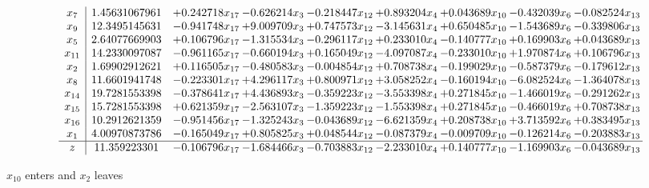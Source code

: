 \documentclass[10pt]{article}
\begin{document}
 \[\begin{array}{c| c c@{\hskip 2pt} c@{\hskip 2pt} c@{\hskip 2pt} c@{\hskip 2pt} c@{\hskip 2pt} c@{\hskip 2pt} c@{\hskip 2pt} }
 x_{7}   &  1.45631067961 & + 0.242718 x_{17} & -0.626214 x_{3} & -0.218447 x_{12} & + 0.893204 x_{4} & + 0.043689 x_{10} & -0.432039 x_{6} & -0.082524 x_{13}\\
 x_{9}   &  12.3495145631 & -0.941748 x_{17} & + 9.009709 x_{3} & + 0.747573 x_{12} & -3.145631 x_{4} & + 0.650485 x_{10} & -1.543689 x_{6} & -0.339806 x_{13}\\
 x_{5}   &  2.64077669903 & + 0.106796 x_{17} & -1.315534 x_{3} & -0.296117 x_{12} & + 0.233010 x_{4} & -0.140777 x_{10} & + 0.169903 x_{6} & + 0.043689 x_{13}\\
 x_{11}   &  14.2330097087 & -0.961165 x_{17} & -0.660194 x_{3} & + 0.165049 x_{12} & -4.097087 x_{4} & -0.233010 x_{10} & + 1.970874 x_{6} & + 0.106796 x_{13}\\
 x_{2}   &  1.69902912621 & + 0.116505 x_{17} & -0.480583 x_{3} & -0.004854 x_{12} & + 0.708738 x_{4} & -0.199029 x_{10} & -0.587379 x_{6} & -0.179612 x_{13}\\
 x_{8}   &  11.6601941748 & -0.223301 x_{17} & + 4.296117 x_{3} & + 0.800971 x_{12} & + 3.058252 x_{4} & -0.160194 x_{10} & -6.082524 x_{6} & -1.364078 x_{13}\\
 x_{14}   &  19.7281553398 & -0.378641 x_{17} & + 4.436893 x_{3} & -0.359223 x_{12} & -3.553398 x_{4} & + 0.271845 x_{10} & -1.466019 x_{6} & -0.291262 x_{13}\\
 x_{15}   &  15.7281553398 & + 0.621359 x_{17} & -2.563107 x_{3} & -1.359223 x_{12} & -1.553398 x_{4} & + 0.271845 x_{10} & -0.466019 x_{6} & + 0.708738 x_{13}\\
 x_{16}   &  10.2912621359 & -0.951456 x_{17} & -1.325243 x_{3} & -0.043689 x_{12} & -6.621359 x_{4} & + 0.208738 x_{10} & + 3.713592 x_{6} & + 0.383495 x_{13}\\
 x_{1}   &  4.00970873786 & -0.165049 x_{17} & + 0.805825 x_{3} & + 0.048544 x_{12} & -0.087379 x_{4} & -0.009709 x_{10} & -0.126214 x_{6} & -0.203883 x_{13}\\
\hline
z    &  11.359223301 & -0.106796 x_{17} & -1.684466 x_{3} & -0.703883 x_{12} & -2.233010 x_{4} & + 0.140777 x_{10} & -1.169903 x_{6} & -0.043689 x_{13}\\
\end{array}\]


 $ x_{10} $ enters and $ x_{2} $ leaves 
\end{document}
